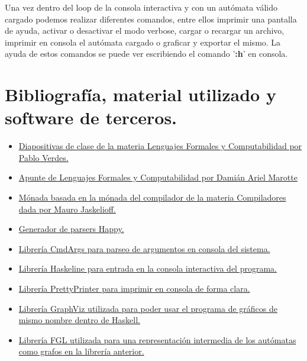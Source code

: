 \documentclass[12pt,a4paper]{article}
\begin{document}
Una vez dentro del loop de la consola interactiva y con un autómata válido cargado 
podemos realizar diferentes comandos, entre ellos imprimir una pantalla de ayuda,
activar o desactivar el modo verbose, cargar o recargar un archivo,
imprimir en consola el autómata cargado o graficar y exportar el mismo. La ayuda
de estos comandos se puede ver escribiendo el comando '\textbf{:h}' en consola.

\newpage

\section{Bibliografía, material utilizado y software de terceros.}
\begin{itemize}
  \item \href{https://dcc.fceia.unr.edu.ar/es/lcc/r213}
             {Diapositivas de clase de la materia Lenguajes Formales y Computabilidad por Pablo Verdes.}
  \item \href{https://github.com/damianarielm/lcc/blob/master/2%20Ano/Lenguajes%20Formales%20y%20Computabilidad/Lenguajes%20Formales.pdf}
             {Apunte de Lenguajes Formales y Computabilidad por Damián Ariel Marotte}
  \item \href{https://github.com/compiladores-lcc/compiladores2021/blob/main/src/MonadFD4.hs}
             {Mónada basada en la mónada del compilador de la materia Compiladores dada por Mauro Jaskelioff.}
  \item \href{https://www.haskell.org/happy/}
             {Generador de parsers Happy.}
  \item \href{https://hackage.haskell.org/package/cmdargs}
             {Librería CmdArgs para parseo de argumentos en consola del sistema.}
  \item \href{https://hackage.haskell.org/package/haskeline}
             {Librería Haskeline para entrada en la consola interactiva del programa.}
  \item \href{https://hackage.haskell.org/package/prettyprinter}
             {Librería PrettyPrinter para imprimir en consola de forma clara.}
  \item \href{https://hackage.haskell.org/package/graphviz}
             {Librería GraphViz utilizada para poder usar el programa de gráficos de mismo nombre dentro de Haskell.}
  \item \href{https://hackage.haskell.org/package/fgl-5.7.0.3}
             {Librería FGL utilizada para una representación intermedia de los autómatas como grafos en la librería anterior.}
\end{itemize}
\end{document}
